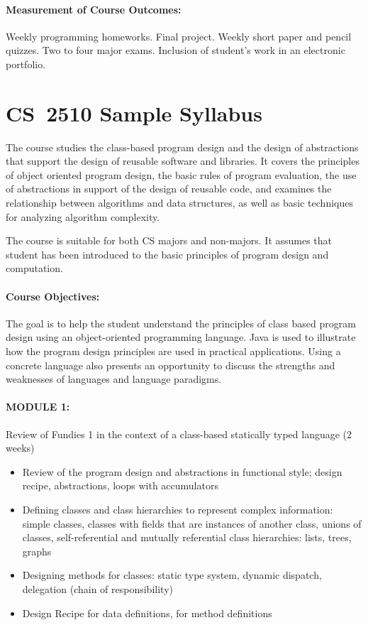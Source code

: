 \documentclass[11pt]{article}
\begin{document}
\paragraph{Measurement of Course Outcomes:}
%
Weekly programming homeworks. Final project. Weekly short paper and pencil quizzes. Two to four major exams. Inclusion of student's work in an electronic portfolio.

\pagebreak

\section*{CS~2510 Sample Syllabus}

The course studies the class-based program design and the design of abstractions that support the design of reusable software and libraries. It covers the principles of object oriented program design, the basic rules of program evaluation, the use of abstractions in support of the design of reusable code, and examines the relationship between algorithms and data structures, as well as basic techniques for analyzing algorithm complexity.

The course is suitable for both CS majors and non-majors. It assumes that student has been introduced to the basic principles of program design and computation.

\paragraph{Course Objectives:}
%
The goal is to help the student understand the principles of class
based program design using an object-oriented programming
language. Java is used to illustrate how the program design principles
are used in practical applications. Using a concrete language also
presents an opportunity to discuss the strengths and weaknesses of
languages and language paradigms.

\paragraph{MODULE 1:}
%
Review of Fundies 1 in the context of a class-based statically typed language (2 weeks)
%
\begin{itemize}
\item Review of the program design and abstractions in functional style;
  design recipe, abstractions, loops with accumulators
\item Defining classes and class hierarchies to represent complex information:
  simple classes, classes with fields that are instances of another class, 
  unions of classes, self-referential and mutually referential class   
  hierarchies: lists, trees, graphs
\item Designing methods for classes: static type system, dynamic dispatch,
  delegation (chain of responsibility)
\item Design Recipe for data definitions, for method definitions
\end{itemize}
\end{document}
